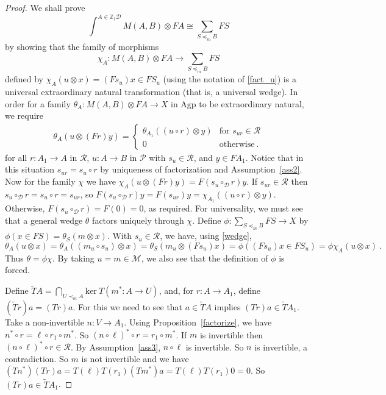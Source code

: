 \documentclass[a4paper,12pt,reqno]{amsart}
\theoremstyle{definition}
\theoremstyle{fact}
\theoremstyle{genquest}
\theoremstyle{step}
\newcommand{\dd}{\colon}
\newcommand{\lra}{\longrightarrow}
\newcommand{\ra}{\rightarrow}
\def\CD{{\mathscr D}}
\def\CM{{\mathscr M}}
\def\CP{{\mathscr P}}
\def\CR{{\mathscr R}}
\begin{document}
\begin{proof}
We shall prove $$\int^{A\in \mathbb{Z}_{\dagger}\CD}{M(A,B)\otimes FA} \cong \sum_{S\preceq_m B}{FS}$$
by showing that the family of morphisms
$$ \chi_A \dd M(A,B)\otimes FA \lra \sum_{S\preceq_m B}{FS} $$
defined by $\chi_A(u\otimes x) = (Fs_u)x\in FS_u$ (using the notation of \eqref{fact_u}) 
is a universal extraordinary natural transformation (that is, a universal wedge). 
In order for a family $\theta_A \dd M(A,B)\otimes FA \ra X$ in $\mathrm{Agp}$ to be
extraordinary natural, we require 
\begin{eqnarray}\label{wedge}
\theta_A(u\otimes (Fr)y) = 
\begin{cases}
\theta_{A_1}((u\circ r)\otimes y) & \text{for }  s_{ur}\in \CR \\
0 & \text{otherwise} \ .
\end{cases}
\end{eqnarray}
for all $r\dd A_1\ra A$ in $\CR$, $u\dd A\ra B$ in $\CP$ with $s_u \in \CR$, and $y\in FA_1$.
Notice that in this situation $s_{ur} = s_u\circ r$ by uniqueness of factorization and Assumption~\ref{ass2}. 
Now for the family $\chi$ we have $\chi_A(u\otimes (Fr)y) = F(s_u\circ_{\CD}r)y$. 
If $s_{ur}\in \CR$ then $s_u\circ_{\CD}r = s_u\circ r = s_{ur}$, so
$F(s_u\circ_{\CD}r)y = F(s_{ur})y = \chi_{A_1}((u\circ r)\otimes y)$.
Otherwise, $F(s_u\circ_{\CD}r) = F(0) = 0$, as required.
For universality, we must see that a general wedge $\theta$ factors uniquely through $\chi$.
Define $\phi \dd \sum_{S\preceq_m B}{FS} \ra X$ by $\phi(x\in FS) = \theta_S(m\otimes x)$.
With $s_u\in \CR$, we have, using \eqref{wedge}, 
$$\theta_A(u\otimes x) = \theta_A((m_u\circ s_u)\otimes x) = \theta_S(m_u\otimes (Fs_u)x) = \phi((Fs_u)x\in FS_u) = \phi \chi_A(u\otimes x) \ .$$
Thus $\theta =  \phi \chi$. By taking $u=m\in \CM$, we also see that the definition of $\phi$ is forced. 

Define $\widetilde{T}A = \bigcap_{U\prec_m A} {\mathrm{ker} \ {T(m^*:A\ra U)}}$,
and, for $r\dd A\ra A_1$, define $(\widetilde{T}r)a = (Tr)a$.
For this we need to see that $a\in \widetilde{T}A$ implies $(Tr)a\in \widetilde{T}A_1$.
Take a non-invertible $n\dd V\ra A_1$. Using Proposition~\ref{factorize}, we have $n^*\circ r = \ell \circ r_1 \circ m^*$. So $(n\circ \ell)^*\circ r = r_1\circ m^*$. If $m$ is invertible then $(n\circ \ell)^*\circ r \in \CR$. By Assumption~\ref{ass3}, $n\circ \ell$ is invertible. So $n$ is invertible, a contradiction. So $m$ is not invertible and we have 
$(Tn^*)(Tr)a = T(\ell)T(r_1)(Tm^*)a = T(\ell)T(r_1)0 = 0$. So $(Tr)a \in \widetilde{T}A_1$.         


\end{proof}
\end{document}
